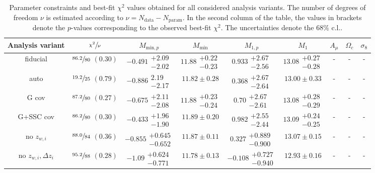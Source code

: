 \documentclass[a4paper,11pt]{article}
\newcommand\Tstrut{\rule{0pt}{3ex}}
\begin{document}
\begin{table}
\caption{Parameter constraints and best-fit $\chi^{2}$ values obtained for all considered analysis variants. The number of degrees of freedom $\nu$ is estimated according to $\nu = N_{\mathrm{data}}-N_{\mathrm{param}}$. In the second column of the table, the values in brackets denote the $p$-values corresponding to the observed best-fit $\chi^{2}$. The uncertainties denote the $68 \%$ c.l..} \label{tab:constraints_robustness}
\begin{center}
\begin{tabular}{ccccccccc}
\hline\hline 
Analysis variant & $\sfrac{\chi^{2}}{\nu}$ & $M_{\mathrm{min}, p}$ & $M_{\mathrm{min}}$ & $M_{1, p}$ & $M_{1}$ & $A_{\mu}$ & $\Omega_{c}$ & $\sigma_{8}$ \\ \hline \Tstrut       
fiducial & $\sfrac{86.2}{80}$ $(0.30)$ & $-0.491\substack{+2.09 \\ -2.02}$ & $11.88\substack{+0.22 \\ -0.23}$ & $0.933\substack{+2.67 \\ -2.56}$ & $13.08\substack{+0.27 \\ -0.28}$ & - & - & - \\
auto & $\sfrac{19.2}{25}$ $(0.79)$ & $-0.886\substack{2.19 \\ -2.17}$ & $11.82 \pm 0.28$ & $0.368\substack{+2.67 \\ -2.64}$ & $13.00 \pm 0.33$  & - & - & - \\
G cov & $\sfrac{87.2}{80}$ $(0.27)$ & $-0.675\substack{+2.11 \\ -2.08}$ & $11.88\substack{+0.23 \\ -0.24}$ & $0.70\substack{+2.67 \\ -2.61}$ & $13.08\substack{+0.28 \\ -0.29}$ & - & - & - \\
G+SSC cov & $\sfrac{86.2}{80}$ $(0.30)$ & $-0.433\substack{+1.96 \\ -1.90}$ & $11.89 \pm 0.20$ & $0.982\substack{+2.55 \\ -2.44}$ & $13.09\substack{+0.24 \\ -0.25}$ & - & - & - \\
no $z_{w, i}$ & $\sfrac{88.0}{84}$ $(0.36)$ & $-0.855\substack{+0.645 \\ -0.652}$ & $11.87 \pm 0.11$ & $0.327\substack{+0.889 \\ -0.900}$ & $13.07 \pm 0.15$ & - & - & - \\
no $z_{w, i}, \Delta z_{i}$ & $\sfrac{95.2}{88}$ $(0.28)$ & $-1.09\substack{+0.624 \\ -0.771}$ & $11.78 \pm 0.13$ & $-0.108\substack{+0.727 \\ -0.940}$ & $12.93 \pm 0.16$ & - & - & - \\

\end{tabular}
\end{center}
\end{table}
\end{document}
